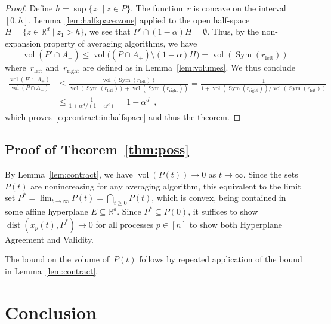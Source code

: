 \documentclass{article}
\DeclareMathOperator{\vol}{vol}
\DeclareMathOperator{\dist}{dist}
\DeclareMathOperator{\Sym}{Sym}
\newcommand{\IR}{\mathbb{R}}
\renewcommand{\leq}{\leqslant}
\renewcommand{\geq}{\geqslant}
\begin{document}
\begin{proof}
Define $h = \sup\{ z_1 \mid z\in P\}$.
The function~$r$ is concave on the interval~$[0,h]$.
Lemma~\ref{lem:halfspace:zone} applied to the open half-space
$H = \{ z\in \IR^d \mid z_1 > h\}$, we see that
$P' \cap (1-\alpha)H = \emptyset$.
Thus, by the non-expansion property of averaging algorithms, we have
\begin{equation}
\vol(P'\cap A_+) \leq \vol\big((P\cap A_+) \setminus (1-\alpha)H\big) =  \vol(\Sym(r_\mathrm{left}))
\end{equation}
where~$r_\mathrm{left}$ and~$r_\mathrm{right}$ are defined as in Lemma~\ref{lem:volumes}.
We thus conclude
\begin{equation}
\begin{split}
\frac{\vol(P'\cap A_+)}{\vol(P\cap A_+)}
& \leq
\frac{\vol(\Sym(r_\mathrm{left}))}{\vol(\Sym(r_\mathrm{left})) + \vol(\Sym(r_\mathrm{right}))}
=
\frac{1}{1 + \vol(\Sym(r_\mathrm{right}))/ \vol(\Sym(r_\mathrm{left}))}
\\
& \leq
\frac{1}{1 + \alpha^d/(1-\alpha^d)}
=
1 - \alpha^d
\enspace,
\end{split}
\end{equation}
which proves~\eqref{eq:contract:in:halfspace}
and thus the theorem.
\end{proof}

\subsection{Proof of Theorem~\ref{thm:poss}}

By Lemma~\ref{lem:contract}, we have $\vol(P(t)) \to 0$ as $t\to\infty$.
Since the sets~$P(t)$ are nonincreasing for any averaging algorithm, this equivalent to the limit set $P^* = \lim_{t\to\infty} P(t) = \bigcap_{t\geq 0} P(t)$, which is convex, being contained in some affine hyperplane $E\subseteq \IR^d$.
Since $P^* \subseteq P(0)$, it suffices to show $\dist(x_p(t),P^*) \to 0$ for all processes $p\in[n]$ to show both Hyperplane Agreement and Validity.


The bound on the volume of~$P(t)$ follows by repeated application of the bound in Lemma~\ref{lem:contract}.


\section{Conclusion}\label{sec:conclusion}



\end{document}
